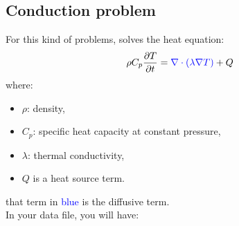 \subsection{Conduction problem}
For this kind of problems, \trust solves the heat equation:
$$
\rho C_p \frac{\partial T}{\partial t} = \textcolor{blue}{\nabla \cdot \left(\lambda \nabla T\right)} + Q
$$
where:
\begin{itemize}
\item $\rho$: density,
\item $C_p$: specific heat capacity at constant pressure,
\item $\lambda$: thermal conductivity,
\item $Q$ is a heat source term.
\end{itemize}

\Note that term in \textcolor{blue}{blue} is the diffusive term.\\

In your data file, you will have:

\begin{center}
\end{center}

